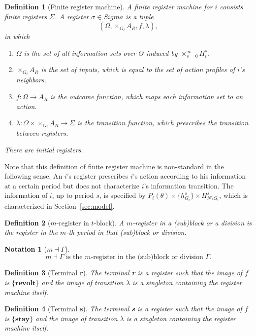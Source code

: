 \documentclass[12pt,letter]{article}
\newtheorem{definition}{Definition}[section]
\newtheorem{notation}{Notation}[section]
\theoremstyle{definition}
\theoremstyle{remark}
\theoremstyle{claim}
\begin{document}
\begin{definition}[Finite register machine]
A finite register machine for $i$ consists finite registers $\Sigma$. A register $\sigma\in Sigma$ is a tuple \[(\Omega, \times_{G_i}A_R,f,\lambda),\] in which 
\begin{enumerate}
\item $\Omega$ is the set of all information sets over $\Theta$ induced by $\times^{\infty}_{s=0}H^s_i$. 
\item $\times_{G_i}A_R$ is the set of inputs, which is equal to the set of action profiles of $i$'s neighbors.
\item $f:\Omega\rightarrow A_{R}$ is the outcome function, which maps each information set to an action.
\item $\lambda: \Omega\times \times_{G_i}A_R \rightarrow \Sigma$ is the transition function, which prescribes the transition between registers.
\end{enumerate}
There are initial registers. 
\end{definition}

Note that this definition of finite register machine is non-standard in the following sense. An $i$'s register prescribes $i$'s action according to his information at a certain period but does not characterize $i$'s information transition. The information of $i$, up to period $s$, is specified by $P_i(\theta)\times \{h^s_{G_i}\}\times H^s_{N\setminus G_i}$, which is characterized in Section~\ref{sec:model}. 

\begin{definition}[$m$-register in $t$-block]
A $m$-register in a (sub)block or a division is the register in the $m$-th period in that (sub)block or division. 
\end{definition}

\begin{notation}[$m\dashv\Gamma$]
\[\text{$m\dashv\Gamma$ is the $m$-register in the (sub)block or division $\Gamma$.}\]
\end{notation}

\begin{definition}[Terminal \textbf{r}]
The terminal \textbf{r} is a register such that the image of $f$ is $\{\textbf{revolt}\}$ and the image of transition $\lambda$ is a singleton containing the register machine itself. 
\end{definition}

\begin{definition}[Terminal \textbf{s}]
The terminal \textbf{s} is a register such that the image of $f$ is $\{\textbf{stay}\}$ and the image of transition $\lambda$ is a singleton containing the register machine itself. 
\end{definition}
\end{document}
